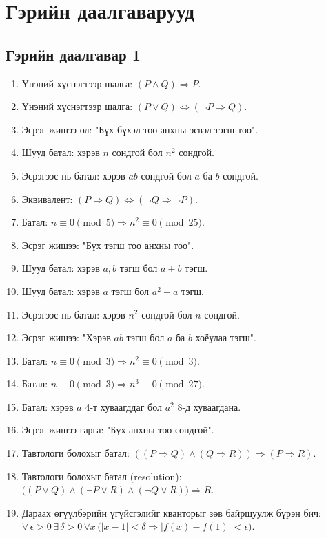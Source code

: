 \chapter{Гэрийн даалгаварууд}
\section{Гэрийн даалгавар 1 }
\begin{enumerate}
  \item Үнэний хүснэгтээр шалга: $(P\land Q)\Rightarrow P$.
  \item Үнэний хүснэгтээр шалга: $(P\lor Q)\Leftrightarrow(\lnot P\Rightarrow Q)$.
  \item Эсрэг жишээ ол: "Бүх бүхэл тоо анхны эсвэл тэгш тоо".
  \item Шууд батал: хэрэв $n$ сондгой бол $n^2$ сондгой.
  \item Эсрэгээс нь батал: хэрэв $ab$ сондгой бол $a$ ба $b$ сондгой.
  \item Эквивалент: $(P\Rightarrow Q)\Leftrightarrow(\lnot Q\Rightarrow\lnot P)$.
  \item Батал: $n\equiv0\pmod{5} \Rightarrow n^2\equiv0\pmod{25}$.
  \item Эсрэг жишээ: "Бүх тэгш тоо анхны тоо".
  \item Шууд батал: хэрэв $a,b$ тэгш бол $a+b$ тэгш.
  \item Шууд батал: хэрэв $a$ тэгш бол $a^2+a$ тэгш.
  \item Эсрэгээс нь батал: хэрэв $n^2$ сондгой бол $n$ сондгой.
  \item Эсрэг жишээ: "Хэрэв $ab$ тэгш бол $a$ ба $b$ хоёулаа тэгш".
  \item Батал: $n\equiv0\pmod{3} \Rightarrow n^2\equiv0\pmod{3}$.
  \item Батал: $n\equiv0\pmod{3} \Rightarrow n^3 \equiv 0 \pmod{27}$.
  \item Батал: хэрэв $a$ 4-т хуваагддаг бол $a^2$ 8-д хуваагдана.
  \item Эсрэг жишээ гарга: "Бүх анхны тоо сондгой".
  \item Тавтологи болохыг батал: $((P\Rightarrow Q)\land(Q\Rightarrow R))\Rightarrow(P\Rightarrow R)$.
  \item Тавтологи болохыг батал (resolution): $\big((P\lor Q)\land(\lnot P\lor R)\land(\lnot Q\lor R)\big)\Rightarrow R$.
  \item Дараах өгүүлбэрийн үгүйсгэлийг кванторыг зөв байршуулж бүрэн бич:
        $\forall\,\epsilon>0\,\exists\,\delta>0\,\forall x\,\big(|x-1|<\delta \Rightarrow |f(x)-f(1)|<\epsilon\big)$.

\end{enumerate}
